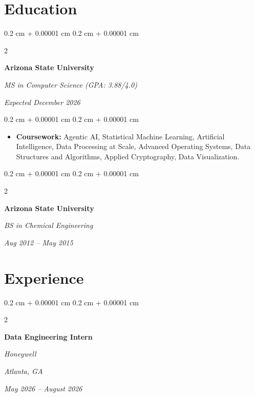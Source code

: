 \documentclass[10pt, letterpaper]{article}
\newenvironment{highlights}{
    \begin{itemize}[
        topsep=0.10 cm,
        parsep=0.10 cm,
        partopsep=0pt,
        itemsep=0pt,
        leftmargin=0.4 cm + 10pt
    ]
}{
    \end{itemize}
} %
\newenvironment{onecolentry}{
    \begin{adjustwidth}{
        0.2 cm + 0.00001 cm
    }{
        0.2 cm + 0.00001 cm
    }
}{
    \end{adjustwidth}
} %
\newenvironment{twocolentry}[2][]{
    \onecolentry
    \def\secondColumn{#2}
    \setcolumnwidth{\fill, 4.5 cm}
    \begin{paracol}{2}
}{
    \switchcolumn \raggedleft \secondColumn
    \end{paracol}
    \endonecolentry
} %
\begin{document}
        \vspace{0.008 cm}

    \section{Education}

            \begin{twocolentry}{
        \textit{Expected December 2026}}
            \textbf{Arizona State University}

            \textit{MS in Computer Science (GPA: 3.88/4.0)}
        \end{twocolentry}

        \vspace{0.10 cm}
        \begin{onecolentry}
            \begin{highlights}
                \item \textbf{Coursework:} Agentic AI, Statistical Machine Learning, Artificial Intelligence, Data Processing at Scale, Advanced Operating Systems, Data Structures and Algorithms, Applied Cryptography, Data Visualization.
            \end{highlights}
        \end{onecolentry}

\vspace{0.08 cm}

        \begin{twocolentry}{
        \textit{Aug 2012 -- May 2015}}
            \textbf{Arizona State University}

            \textit{BS in Chemical Engineering}
        \end{twocolentry}

    \vspace{0.15 cm}

    \section{Experience}

        \begin{twocolentry}{
        \textit{Atlanta, GA}

        \textit{May 2026 -- August 2026}}
            \textbf{Data Engineering Intern}

            \textit{Honeywell}
        \end{twocolentry}
\end{document}

